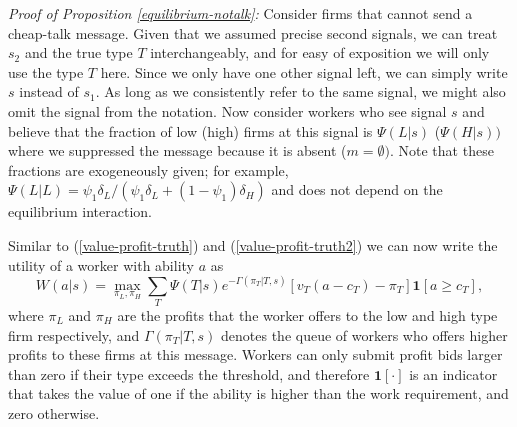 \documentclass[12pt]{article}
\theoremstyle{plain}
\begin{document}
\bigskip \bigskip

\noindent \textit{Proof of Proposition \ref{equilibrium-notalk}:} Consider firms that
cannot send a cheap-talk message. Given that we assumed precise second
signals, we can treat $s_{2}$ and the true type $T$ interchangeably, and for
easy of exposition we will only use the type $T$ here. Since we only have
one other signal left, we can simply write $s$ instead of $s_{1}.$ As long
as we consistently refer to the same signal, we might also omit the signal
from the notation. Now consider workers who see signal $s$ and believe that
the fraction of low (high) firms at this signal is $\Psi (L|s)$ ($\Psi
(H|s)) $ where we suppressed the message because it is absent ($m=\emptyset
).$ Note that these fractions are exogeneously given; for example, $\Psi
(L|L)=\psi _{1}\delta _{L}/(\psi _{1}\delta _{L}+(1-\psi _{1})\delta _{H})$
and does not depend on the equilibrium interaction.

Similar to (\ref{value-profit-truth}) and (\ref{value-profit-truth2}) we can
now write the utility of a worker with ability $a$ as%
\begin{equation}
W(a|s)=\max_{\pi _{L},\pi _{H}}\sum_{T}\Psi (T|s)e^{-\Gamma (\pi _{T}|T,s)} 
\left[ v_{T}(a-c_{T})-\pi _{T}\right] \boldsymbol{1}[a\geq c_{T}],
\label{objective-babbling}
\end{equation}%
where $\pi _{L}$ and $\pi _{H}$ are the profits that the worker offers to
the low and high type firm respectively, and $\Gamma (\pi _{T}|T,s)$ denotes
the queue of workers who offers higher profits to these firms at this
message. Workers can only submit profit bids larger than zero if their type
exceeds the threshold, and therefore $\boldsymbol{1[\cdot ]}$ is an
indicator that takes the value of one if the ability is higher than the work
requirement, and zero otherwise.
\end{document}
